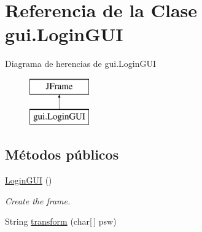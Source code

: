 \hypertarget{classgui_1_1_login_g_u_i}{}\section{Referencia de la Clase gui.\+Login\+G\+UI}
\label{classgui_1_1_login_g_u_i}
Diagrama de herencias de gui.\+Login\+G\+UI\begin{figure}[H]
\begin{center}
\leavevmode
\includegraphics[height=2.000000cm]{classgui_1_1_login_g_u_i}
\end{center}
\end{figure}
\subsection*{Métodos públicos}
\begin{DoxyCompactItemize}
\item 
\mbox{\hyperlink{classgui_1_1_login_g_u_i_a7a72f964aac46a80b5bb46f116d342fb}{Login\+G\+UI}} ()
\begin{DoxyCompactList}\small\item\em Create the frame. \end{DoxyCompactList}\item 
String \mbox{\hyperlink{classgui_1_1_login_g_u_i_a75dfb4f95ca55f19138783c531c5d02c}{transform}} (char\mbox{[}$\,$\mbox{]} psw)
\end{DoxyCompactItemize}
